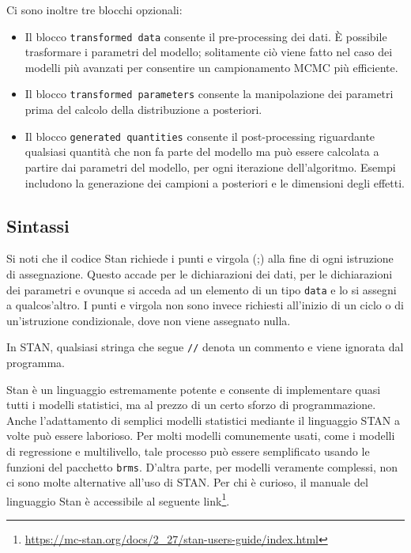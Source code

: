 \documentclass[
  11pt,
]{krantz}
\providecommand{\tightlist}{%
  \setlength{\itemsep}{0pt}\setlength{\parskip}{0pt}}
\renewcommand{\href}[2]{#2\footnote{\url{#1}}}
\theoremstyle{definition}
\theoremstyle{definition}
\theoremstyle{definition}
\theoremstyle{definition}
\theoremstyle{remark}
\begin{document}
Ci sono inoltre tre blocchi opzionali:

\begin{itemize}
\tightlist
\item
  Il blocco \texttt{transformed\ data} consente il pre-processing dei dati. È possibile trasformare i parametri del modello; solitamente ciò viene fatto nel caso dei modelli più avanzati per consentire un campionamento MCMC più efficiente.
\item
  Il blocco \texttt{transformed\ parameters} consente la manipolazione dei parametri prima del calcolo della distribuzione a posteriori.
\item
  Il blocco \texttt{generated\ quantities} consente il post-processing riguardante qualsiasi quantità che non fa parte del modello ma può essere calcolata a partire dai parametri del modello, per ogni iterazione dell'algoritmo. Esempi includono la generazione dei campioni a posteriori e le dimensioni degli effetti.
\end{itemize}

\hypertarget{sintassi}{%
\subsection{Sintassi}\label{sintassi}}

Si noti che il codice Stan richiede i punti e virgola (;) alla fine di ogni istruzione di assegnazione. Questo accade per le dichiarazioni dei dati, per le dichiarazioni dei parametri e ovunque si acceda ad un elemento di un tipo \texttt{data} e lo si assegni a qualcos'altro. I punti e virgola non sono invece richiesti all'inizio di un ciclo o di un'istruzione condizionale, dove non viene assegnato nulla.

In STAN, qualsiasi stringa che segue \texttt{//} denota un commento e viene ignorata dal programma.

Stan è un linguaggio estremamente potente e consente di implementare quasi tutti i modelli statistici, ma al prezzo di un certo sforzo di programmazione. Anche l'adattamento di semplici modelli statistici mediante il linguaggio STAN a volte può essere laborioso. Per molti modelli comunemente usati, come i modelli di regressione e multilivello, tale processo può essere semplificato usando le funzioni del pacchetto \texttt{brms}. D'altra parte, per modelli veramente complessi, non ci sono molte alternative all'uso di STAN. Per chi è curioso, il manuale del linguaggio Stan è accessibile al seguente \href{https://mc-stan.org/docs/2_27/stan-users-guide/index.html}{link}.
\end{document}
